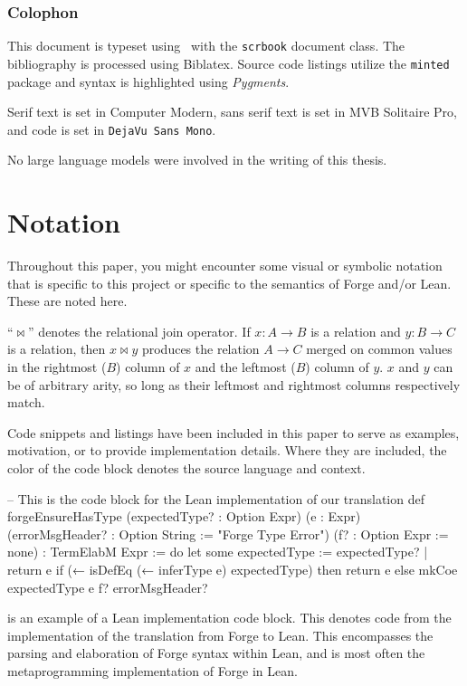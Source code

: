 \subsubsection*{Colophon}
\begin{minipage}{0.7\textwidth}
\raggedright\small
This document is typeset using \XeLaTeX\ with the \texttt{scrbook} document class. The bibliography is processed using Biblatex. Source code listings utilize the \texttt{minted} package and syntax is highlighted using \emph{Pygments}.
\vspace{0.5em}

Serif text is set in Computer Modern, sans serif text is set in \textsf{MVB Solitaire Pro}, and code is set in \texttt{\footnotesize DejaVu Sans Mono}. 
\vspace{0.5em}

No large language models were involved in the writing of this thesis.
\end{minipage}

\newpage
{
  \hypersetup{linkcolor=black}
  \tableofcontents
}

\newpage
\section*{Notation}
Throughout this paper, you might encounter some visual or symbolic notation that is specific to this project or specific to the semantics of Forge and/or Lean. These are noted here. 

``$\bowtie$'' denotes the relational join operator. If $x: A \to B$ is a relation and $y: B \to C$ is a relation, then $x\bowtie y$ produces the relation $A\to C$ merged on common values in the rightmost ($B$) column of $x$ and the leftmost ($B$) column of $y$. $x$ and $y$ can be of arbitrary arity, so long as their leftmost and rightmost columns respectively match. 

Code snippets and listings have been included in this paper to serve as examples, motivation, or to provide implementation details. Where they are included, the color of the code block denotes the source language and context. 

\begin{leanimpl}
-- This is the code block for the Lean implementation of our translation
def forgeEnsureHasType (expectedType? : Option Expr) (e : Expr)
    (errorMsgHeader? : Option String := "Forge Type Error") 
    (f? : Option Expr := none) : TermElabM Expr := do
  let some expectedType := expectedType? | return e
  if (← isDefEq (← inferType e) expectedType) then
    return e
  else
    mkCoe expectedType e f? errorMsgHeader?
\end{leanimpl}
is an example of a Lean implementation code block. This denotes code from the implementation of the translation from Forge to Lean. This encompasses the parsing and elaboration of Forge syntax within Lean, and is most often the metaprogramming implementation of Forge in Lean. 

